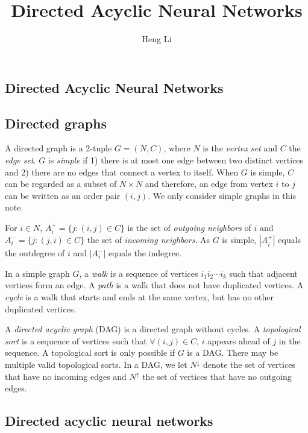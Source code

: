 \documentclass{bioinfo}
\begin{document}

\title[DANN]{Directed Acyclic Neural Networks}
\author[Li]{Heng Li}
\address{Broad Institute, 75 Ames Street, Cambridge, MA 02142, USA}
\maketitle

\begin{methods}

\section{Directed Acyclic Neural Networks}

\subsection{Directed graphs}

A directed graph is a 2-tuple $G=(N,C)$, where $N$ is the \emph{vertex set} and
$C$ the \emph{edge set}. $G$ is \emph{simple} if 1) there is at most one edge
between two distinct vertices and 2) there are no edges that connect a vertex
to itself. When $G$ is simple, $C$ can be regarded as a subset of $N\times N$
and therefore, an edge from vertex $i$ to $j$ can be written as an order pair
$(i,j)$. We only consider simple graphs in this note.

For $i\in N$, $A^+_i=\{j:(i,j)\in C\}$ is the set of \emph{outgoing
neighbors} of $i$ and $A^-_i=\{j:(j,i)\in C\}$ the set of \emph{incoming
neighbors}. As $G$ is simple, $|A^+_i|$ equals the outdegree of $i$ and
$|A^-_i|$ equals the indegree.

In a simple graph $G$, a \emph{walk} is a sequence of vertices $i_1i_2\cdots
i_k$ such that adjacent vertices form an edge. A \emph{path} is a walk that
does not have duplicated vertices. A \emph{cycle} is a walk that starts and
ends at the same vertex, but has no other duplicated vertices.

A \emph{directed acyclic graph} (DAG) is a directed graph without cycles.
A \emph{topological sort} is a sequence of vertices such that $\forall(i,j)\in
C$, $i$ appears ahead of $j$ in the sequence. A topological sort is only
possible if $G$ is a DAG. There may be multiple valid topological sorts.
In a DAG, we let $N^{\downarrow}$ denote the set of vertices that have no incoming edges
and $N^{\uparrow}$ the set of vertices that have no outgoing edges.

\subsection{Directed acyclic neural networks}


\end{methods}
\end{document}
